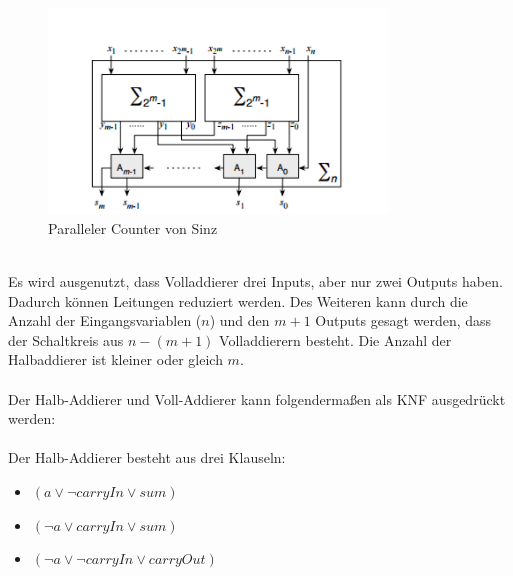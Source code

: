\documentclass[a4,abstract=on]{scrartcl}
\begin{document}
\begin{figure}[H]
\centering
\includegraphics[width=9cm]{sinz_para.png}
\caption{Paralleler Counter von Sinz \cite[aus][Seite 9] {sinz}}
\label{fig:sinz_counter_para}
\end{figure}
\ \\
Es wird ausgenutzt, dass Volladdierer drei Inputs, aber nur zwei Outputs haben. Dadurch können Leitungen reduziert werden. Des Weiteren kann durch die Anzahl der Eingangsvariablen ($n$) und den $m+1$ Outputs gesagt werden, dass der Schaltkreis aus $n-(m+1)$ Volladdierern besteht. Die Anzahl der Halbaddierer ist kleiner oder gleich $m$.\\
\ \\
Der Halb-Addierer und Voll-Addierer kann folgendermaßen als KNF ausgedrückt werden:\\
\ \\
Der Halb-Addierer besteht aus drei Klauseln:
\begin{itemize}
\item[] $(a \vee \neg carryIn \vee sum)$
\item[] $(\neg a \vee carryIn \vee sum)$
\item[] $(\neg a \vee \neg carryIn \vee carryOut )$
\end{itemize}
\end{document}
